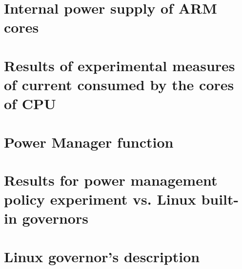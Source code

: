 \begin{appendices}

    \section{Internal power supply of ARM cores}\label{App:A1}
    
    \section{Results of experimental measures of current consumed by the cores of CPU}\label{App:A2}
    
    \section{Power Manager function}\label{App:A3}

    \section{Results for power management policy experiment vs. Linux built-in governors}\label{App:A4}
    
    \section{Linux governor's description}\label{App:A6}
\end{appendices}
